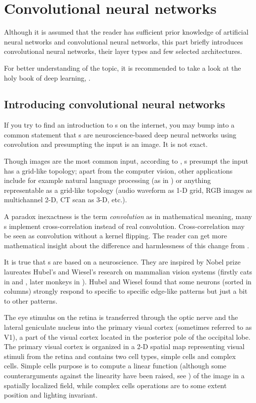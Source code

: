 \chapter{Convolutional neural networks}
\label{cnn}


Although it is assumed that the reader has sufficient prior knowledge of artificial neural networks and convolutional neural networks, this part briefly introduces convolutional neural networks, their layer types and few selected architectures. 

For better understanding of the topic, it is recommended to take a look at the holy book of deep learning, \cite{dl}.

\section{Introducing convolutional neural networks}
\label{understanding-cnn}

If you try to find an introduction to s on the internet, you may bump into a common statement that s are neuroscience-based deep neural networks using convolution and presumpting the input is an image. It is not exact. 

Though images are the most common input, according to \cite{dl}, s presumpt the input has a grid-like topology; apart from the computer vision, other applications include  for example natural language processing (as in \cite{cnn-nlp}) or anything representable as a grid-like topology (audio waveform as 1-D grid, RGB images as multichannel 2-D, CT scan as 3-D, etc.). 

A paradox inexactness is the term \textit{convolution} as in mathematical meaning, many s implement cross-correlation instead of real convolution. Cross-correlation may be seen as convolution without a kernel flipping. The reader can get more mathematical insight about the difference and harmlessness of this change from \cite{dl}. 

It is true that s are based on a neuroscience. They are inspired by Nobel prize laureates Hubel's and Wiesel's research on mammalian vision systems (firstly cats in \cite{hubel-cats1} and \cite{hubel-cats2}, later monkeys in \cite{hubel-monkeys}). Hubel and Wiesel found that some neurons (sorted in columns) strongly respond to specific to specific edge-like patterns but just a bit to other patterns. 

The eye stimulus on the retina is transferred through the optic nerve and the lateral geniculate nucleus into the primary visual cortex (sometimes referred to as V1), a part of the visual cortex located in the posterior pole of the occipital lobe. The primary visual cortex is organized in a 2-D spatial map representing visual stimuli from the retina and contains two cell types, simple cells and complex cells. Simple cells purpose is to compute a linear function (although some counterarguments against the linearity have been raised, see \cite{simple-cells}) of the image in a spatially localized field, while complex cells operations are to some extent position and lighting invariant. 

